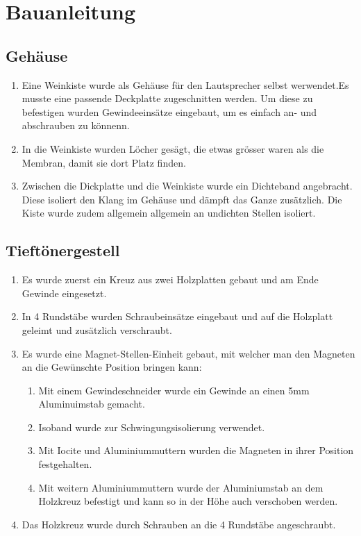 \documentclass[a4paper,11pt]{report}
\begin{document}
\section{Bauanleitung}
\subsection{Gehäuse}
\begin{enumerate}
    \item Eine Weinkiste wurde als Gehäuse für den Lautsprecher selbst werwendet.Es musste eine passende Deckplatte zugeschnitten werden. Um diese zu befestigen wurden Gewindeeinsätze eingebaut, um es einfach an- und abschrauben zu könnenn.
    \item In die Weinkiste wurden Löcher gesägt, die etwas grösser waren als die Membran, damit sie dort Platz finden.
    \item Zwischen die Dickplatte und die Weinkiste wurde ein Dichteband angebracht. Diese isoliert den Klang im Gehäuse und dämpft das Ganze zusätzlich.
    Die Kiste wurde zudem allgemein allgemein an undichten Stellen isoliert. 
\end{enumerate}

\newpage
\subsection{Tieftönergestell}
\begin{enumerate}
    \item Es wurde zuerst ein Kreuz aus zwei Holzplatten gebaut und am Ende Gewinde eingesetzt.
    \item In 4 Rundstäbe wurden Schraubeinsätze eingebaut und auf die Holzplatt geleimt und zusätzlich verschraubt.
    \item Es wurde eine Magnet-Stellen-Einheit gebaut, mit welcher man den Magneten an die Gewünschte Position bringen kann:
    \begin{enumerate}
        \item Mit einem Gewindeschneider wurde ein Gewinde an einen 5mm Aluminuimstab gemacht.
        \item Isoband wurde zur Schwingungsisolierung verwendet.
        \item Mit Iocite und Aluminiummuttern wurden die Magneten in ihrer Position festgehalten.
        \item Mit weitern Aluminiummuttern wurde der Aluminiumstab an dem Holzkreuz befestigt und kann so in der Höhe auch verschoben werden.
    \end{enumerate}
    \item Das Holzkreuz wurde durch Schrauben an die 4 Rundstäbe angeschraubt.
\end{enumerate}
\end{document}
